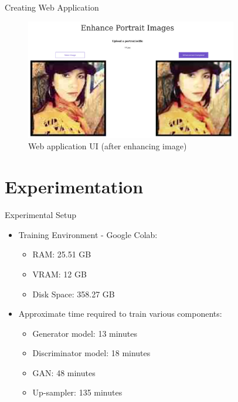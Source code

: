 \documentclass{beamer}
\begin{document}
	\begin{frame}{Creating Web Application}
		\begin{figure}[htbp]
			\centerline{\includegraphics[width=25em]{webapp_ui2.png}}
			\caption{Web application UI (after enhancing image)}
			\label{appui2-fig}
		\end{figure}
	\end{frame}
	

\section{Experimentation}
	\begin{frame}{Experimental Setup}
		\begin{itemize}
			\item Training Environment - Google Colab:
			\begin{itemize}
				\item RAM: 25.51 GB
				\item VRAM: 12 GB
				\item Disk Space: 358.27 GB
			\end{itemize}
			\item Approximate time required to train various components:
			\begin{itemize}
				\item Generator model: 13 minutes
				\item Discriminator model: 18 minutes
				\item GAN: 48 minutes
				\item Up-sampler: 135 minutes
			\end{itemize}
		\end{itemize}
	\end{frame}
\end{document}
